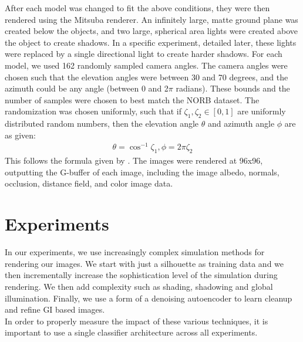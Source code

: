 \documentclass[10pt,twocolumn,letterpaper]{article}
\begin{document}
After each model was changed to fit the above conditions, they were then rendered using the Mitsuba renderer. An infinitely large, matte ground plane was created below the objects, and two large, spherical area lights were created above the object to create shadows. In a specific experiment, detailed later, these lights were replaced by a single directional light to create harder shadows. For each model, we used 162 randomly sampled camera angles. The camera angles were chosen such that the elevation angles were between 30 and 70 degrees, and  the azimuth could be any angle (between 0 and 2$\pi$ radians). These bounds and the number of samples were chosen to best match the NORB dataset. The randomization was chosen uniformly, such that if $\zeta_1,\zeta_2\in[0,1]$ are uniformly distributed random numbers, then the elevation angle $\theta$ and azimuth angle $\phi$ are as given:
\begin{align*}
\theta = \cos^{-1}\zeta_1, \phi = 2\pi \zeta_2
\end{align*}
This follows the formula given by \cite{Pharr:2010:PBR:1854996}. The images were rendered at 96x96, outputting the G-buffer of each image, including the image albedo, normals, occlusion, distance field, and color image data.

\section{Experiments}
In our experiments, we use increasingly complex simulation methods for rendering our images.  We start with just a silhouette as training data and we then incrementally increase the sophistication level of the simulation during rendering.  We then add complexity such as shading, shadowing and global illumination. Finally, we use a form of a denoising autoencoder to learn cleanup  and refine GI based images.\\ 

In order to properly measure the impact of these various techniques, it is important to use a single classifier architecture across all experiments.
\end{document}

